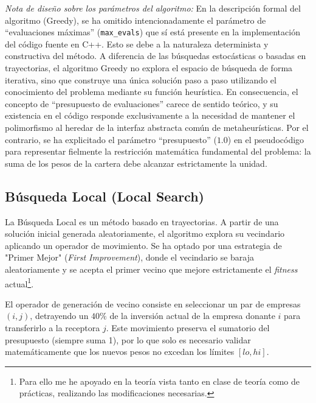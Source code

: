 \textit{Nota de diseño sobre los parámetros del algoritmo:}
En la descripción formal del algoritmo (Greedy), se ha omitido intencionadamente el parámetro de ``evaluaciones máximas'' (\texttt{max\_evals}) que sí está presente en la implementación del código fuente en C++. Esto se debe a la naturaleza determinista y constructiva del método. A diferencia de las búsquedas estocásticas o basadas en trayectorias, el algoritmo Greedy no explora el espacio de búsqueda de forma iterativa, sino que construye una única solución paso a paso utilizando el conocimiento del problema mediante su función heurística. En consecuencia, el concepto de ``presupuesto de evaluaciones'' carece de sentido teórico, y su existencia en el código responde exclusivamente a la necesidad de mantener el polimorfismo al heredar de la interfaz abstracta común de metaheurísticas. Por el contrario, se ha explicitado el parámetro ``presupuesto'' ($1.0$) en el pseudocódigo para representar fielmente la restricción matemática fundamental del problema: la suma de los pesos de la cartera debe alcanzar estrictamente la unidad.

\subsection{Búsqueda Local (Local Search)}
La Búsqueda Local es un método basado en trayectorias. A partir de una solución inicial generada aleatoriamente, el algoritmo explora su vecindario aplicando un operador de movimiento. Se ha optado por una estrategia de "Primer Mejor" (\textit{First Improvement}), donde el vecindario se baraja aleatoriamente y se acepta el primer vecino que mejore estrictamente el \textit{fitness} actual\footnote{Para ello me he apoyado en la teoría vista tanto en clase de teoría como de prácticas, realizando las modificaciones necesarias.}.

El operador de generación de vecino consiste en seleccionar un par de empresas $(i, j)$, detrayendo un $40\%$ de la inversión actual de la empresa donante $i$ para transferirlo a la receptora $j$. Este movimiento preserva el sumatorio del presupuesto (siempre suma 1), por lo que solo es necesario validar matemáticamente que los nuevos pesos no excedan los límites $[lo, hi]$.

